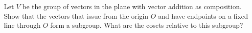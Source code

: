 Let $V$ be the group of vectors in the plane with vector addition as composition. Show that the vectors that issue from the origin $O$ and have endpoints on a fixed line through $O$ form a subgroup. What are the cosets relative to this subgroup?
